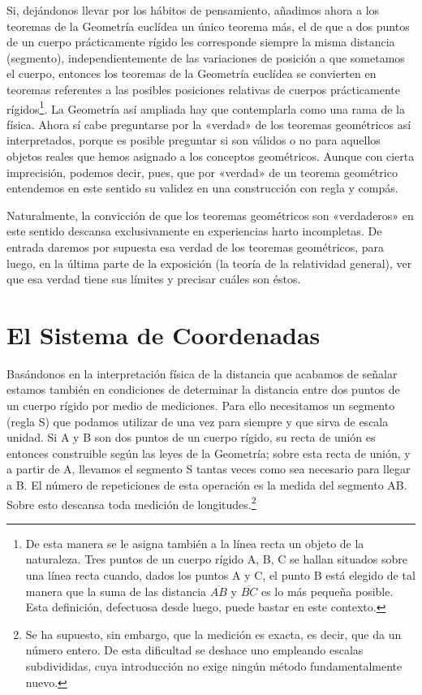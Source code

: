 \documentclass[spanish]{book}
\begin{document}
Si, dejándonos llevar por los hábitos de pensamiento, añadimos ahora a los
teoremas de la Geometría euclídea un único teorema más, el de que a dos puntos de
un cuerpo prácticamente rígido les corresponde siempre la misma distancia
(segmento), independientemente de las variaciones de posición a que sometamos el
cuerpo, entonces los teoremas de la Geometría euclídea se convierten en teoremas
referentes a las posibles posiciones relativas de cuerpos prácticamente rígidos\footnote{
De esta manera se le asigna también a la línea recta un objeto de la naturaleza. 
Tres puntos de un cuerpo rígido A, B, C se hallan situados sobre una línea recta
cuando, dados los puntos A y C, el punto B está elegido de tal manera que la suma 
de las distancia $\overline{AB}$ y $\overline{BC}$ es lo más pequeña posible. 
Esta definición, defectuosa desde luego, puede bastar en este contexto.}. La 
Geometría así ampliada hay que contemplarla como una rama de la física. Ahora sí
cabe preguntarse por la «verdad» de los teoremas geométricos así interpretados,
porque es posible preguntar si son válidos o no para aquellos objetos reales que
hemos asignado a los conceptos geométricos. Aunque con cierta imprecisión,
podemos decir, pues, que por «verdad» de un teorema geométrico entendemos en este
sentido su validez en una construcción con regla y compás.

Naturalmente, la convicción de que los teoremas geométricos son «verdaderos» en
este sentido descansa exclusivamente en experiencias harto incompletas. De entrada
daremos por supuesta esa verdad de los teoremas geométricos, para luego, en la última
parte de la exposición (la teoría de la relatividad general), ver que esa verdad 
tiene sus límites y precisar cuáles son éstos.


\chapter{El Sistema de Coordenadas}

Basándonos en la interpretación física de la distancia que acabamos de señalar
estamos también en condiciones de determinar la distancia entre dos puntos de un
cuerpo rígido por medio de mediciones. Para ello necesitamos un segmento (regla S)
que podamos utilizar de una vez para siempre y que sirva de escala unidad. Si A y B
son dos puntos de un cuerpo rígido, su recta de unión es entonces construible según
las leyes de la Geometría; sobre esta recta de unión, y a partir de A, llevamos el
segmento S tantas veces como sea necesario para llegar a B. El número de repeticiones
de esta operación es la medida del segmento AB. Sobre esto descansa toda medición
de longitudes.\footnote{Se ha supuesto, sin embargo, que la medición es exacta, es 
decir, que da un número entero. De esta dificultad se deshace uno empleando escalas 
subdivididas, cuya introducción no exige ningún método fundamentalmente nuevo.}
\end{document}
